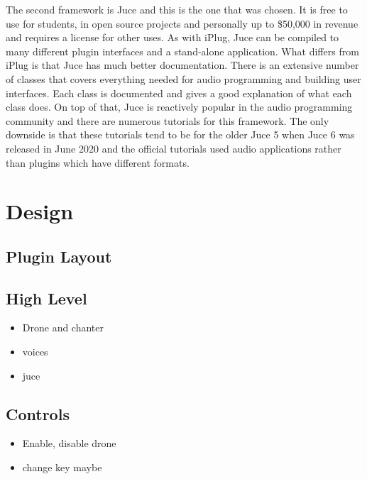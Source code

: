 \documentclass[12pt]{article}
\begin{document}
	The second framework is Juce and this is the one that was chosen. It is free to use for students, in open source projects and personally up to \$50,000 in revenue and 
	requires a license for other uses.
	As with iPlug, Juce can be compiled to many different plugin interfaces and a stand-alone application. What differs from iPlug is that Juce has much better documentation.
	There is an extensive number of classes that covers everything needed for audio programming and building user interfaces. 
	Each class is documented and gives a good explanation of what each class does. On top of that, Juce is reactively popular in the audio programming community and there
	are numerous tutorials for this framework. The only downside is that these tutorials tend to be for the older Juce 5 when Juce 6 was released in June 2020 and the official
	tutorials used audio applications rather than plugins which have different formats.
	

	
\section{Design}
	
	
	\subsection{Plugin Layout}
	
	
	
	
	
	
	
	
	
	
	\subsection{High Level}
	\begin{itemize}
		\item Drone and chanter
		\item voices
		\item juce
	\end{itemize}

	\subsection{Controls}
	\begin{itemize}
		\item Enable, disable drone
		\item change key maybe
	\end{itemize}
	
\end{document}
